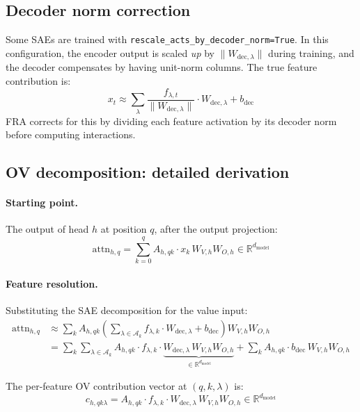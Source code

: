 \documentclass{article}
\theoremstyle{plain}
\theoremstyle{definition}
\theoremstyle{remark}
\newcommand{\dmodel}{d_{\mathrm{model}}}
\newcommand{\RR}{\mathbb{R}}
\begin{document}
\subsection{Decoder norm correction}
\label{app:dec_norm}

Some SAEs are trained with \texttt{rescale\_acts\_by\_decoder\_norm=True}. In this configuration, the encoder output is scaled \emph{up} by $\|W_{\mathrm{dec},\lambda}\|$ during training, and the decoder compensates by having unit-norm columns. The true feature contribution is:
\begin{equation}
    x_t \approx \sum_\lambda \frac{f_{\lambda,t}}{\|W_{\mathrm{dec},\lambda}\|} \cdot W_{\mathrm{dec},\lambda} + b_{\mathrm{dec}}
\end{equation}
FRA corrects for this by dividing each feature activation by its decoder norm before computing interactions.

\subsection{OV decomposition: detailed derivation}
\label{app:ov_derivation}

\paragraph{Starting point.} The output of head $h$ at position $q$, after the output projection:
\begin{equation}
    \mathrm{attn}_{h,q} = \sum_{k=0}^{q} A_{h,qk} \cdot x_k\, W_{V,h} W_{O,h} \in \RR^{\dmodel}
\end{equation}

\paragraph{Feature resolution.} Substituting the SAE decomposition for the value input:
\begin{align}
    \mathrm{attn}_{h,q} &\approx \sum_k A_{h,qk} \left( \sum_{\lambda \in \mathcal{A}_k} f_{\lambda,k} \cdot W_{\mathrm{dec},\lambda} + b_{\mathrm{dec}} \right) W_{V,h} W_{O,h} \\
    &= \sum_k \sum_{\lambda \in \mathcal{A}_k} A_{h,qk} \cdot f_{\lambda,k} \cdot \underbrace{W_{\mathrm{dec},\lambda}\, W_{V,h} W_{O,h}}_{\in \RR^{\dmodel}} + \sum_k A_{h,qk} \cdot b_{\mathrm{dec}}\, W_{V,h} W_{O,h}
\end{align}

The per-feature OV contribution vector at $(q, k, \lambda)$ is:
\begin{equation}
    c_{h,qk\lambda} = A_{h,qk} \cdot f_{\lambda,k} \cdot W_{\mathrm{dec},\lambda}\, W_{V,h} W_{O,h} \in \RR^{\dmodel}
\end{equation}
\end{document}
